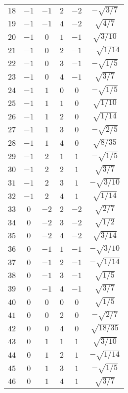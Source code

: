 \begin{table}
\begin{center}
\begin{tabular}{|c|c|c|c|c|c|}
$18$ & $-1$ & $-1$ & $2$ & $-2$ & $-\sqrt{3/7}$ \\ 
$19$ & $-1$ & $-1$ & $4$ & $-2$ & $\sqrt{4/7}$ \\ 
$20$ & $-1$ & $0$ & $1$ & $-1$ & $\sqrt{3/10}$ \\ 
$21$ & $-1$ & $0$ & $2$ & $-1$ & $-\sqrt{1/14}$ \\ 
$22$ & $-1$ & $0$ & $3$ & $-1$ & $-\sqrt{1/5}$ \\ 
$23$ & $-1$ & $0$ & $4$ & $-1$ & $\sqrt{3/7}$ \\ 
$24$ & $-1$ & $1$ & $0$ & $0$ & $-\sqrt{1/5}$ \\ 
$25$ & $-1$ & $1$ & $1$ & $0$ & $\sqrt{1/10}$ \\ 
$26$ & $-1$ & $1$ & $2$ & $0$ & $\sqrt{1/14}$ \\ 
$27$ & $-1$ & $1$ & $3$ & $0$ & $-\sqrt{2/5}$ \\ 
$28$ & $-1$ & $1$ & $4$ & $0$ & $\sqrt{8/35}$ \\ 
$29$ & $-1$ & $2$ & $1$ & $1$ & $-\sqrt{1/5}$ \\ 
$30$ & $-1$ & $2$ & $2$ & $1$ & $\sqrt{3/7}$ \\ 
$31$ & $-1$ & $2$ & $3$ & $1$ & $-\sqrt{3/10}$ \\ 
$32$ & $-1$ & $2$ & $4$ & $1$ & $\sqrt{1/14}$ \\ 
$33$ & $0$ & $-2$ & $2$ & $-2$ & $\sqrt{2/7}$ \\ 
$34$ & $0$ & $-2$ & $3$ & $-2$ & $\sqrt{1/2}$ \\ 
$35$ & $0$ & $-2$ & $4$ & $-2$ & $\sqrt{3/14}$ \\ 
$36$ & $0$ & $-1$ & $1$ & $-1$ & $-\sqrt{3/10}$ \\ 
$37$ & $0$ & $-1$ & $2$ & $-1$ & $-\sqrt{1/14}$ \\ 
$38$ & $0$ & $-1$ & $3$ & $-1$ & $\sqrt{1/5}$ \\ 
$39$ & $0$ & $-1$ & $4$ & $-1$ & $\sqrt{3/7}$ \\ 
$40$ & $0$ & $0$ & $0$ & $0$ & $\sqrt{1/5}$ \\ 
$41$ & $0$ & $0$ & $2$ & $0$ & $-\sqrt{2/7}$ \\ 
$42$ & $0$ & $0$ & $4$ & $0$ & $\sqrt{18/35}$ \\ 
$43$ & $0$ & $1$ & $1$ & $1$ & $\sqrt{3/10}$ \\ 
$44$ & $0$ & $1$ & $2$ & $1$ & $-\sqrt{1/14}$ \\ 
$45$ & $0$ & $1$ & $3$ & $1$ & $-\sqrt{1/5}$ \\ 
$46$ & $0$ & $1$ & $4$ & $1$ & $\sqrt{3/7}$ \\ 

\end{tabular}
\end{center}
\end{table}
